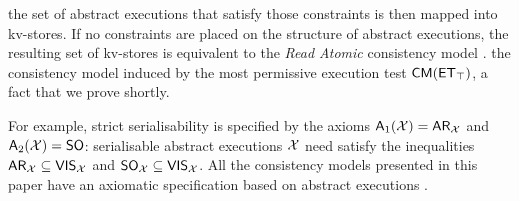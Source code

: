 %

 the set of abstract executions that satisfy those constraints  
is then mapped into kv-stores. 
 If no 
constraints are placed on the structure of abstract executions, 
the resulting set of kv-stores is equivalent to the \emph{Read Atomic} 
consistency model \cite{ramp}. the consistency model induced by the most 
permissive execution test $\CMs(\ET_{\top})$, a fact that we prove shortly.



For example, strict serialisability is specified by the axioms $\mathsf{A}_{1}(\mathcal{X}) = \mathsf{AR}_{\mathcal{X}}$ 
and $\mathsf{A}_{2}(\mathcal{X}) = \mathsf{SO}$: 
serialisable abstract executions $\mathcal{X}$ need satisfy
the inequalities $\mathsf{AR}_{\mathcal{X}} \subseteq \mathsf{VIS}_{\mathcal{X}}$ and $\mathsf{SO}_{\mathcal{X}} \subseteq \mathsf{VIS}_{\mathcal{X}}$.
All the consistency models presented in this paper have an axiomatic 
specification based on abstract executions \cite{principle-eventual-consistency,surech-session-guarantee,framework-concur,laws}. 

